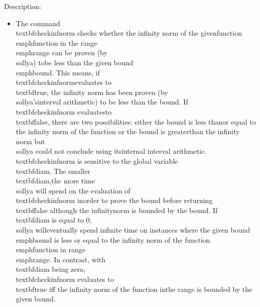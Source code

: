 \noindent Description: \begin{itemize}

\item The command \\textbf{checkinfnorm} checks whether the infinity norm of the given\n   function \\emph{function} in the range \\emph{range} can be proven (by \\sollya) to\n   be less than the given bound \\emph{bound}. This means, if \\textbf{checkinfnorm}\n   evaluates to \\textbf{true}, the infinity norm has been proven (by \\sollya's\n   interval arithmetic) to be less than the bound. If \\textbf{checkinfnorm} evaluates\n   to \\textbf{false}, there are two possibilities: either the bound is less than\n   or equal to the infinity norm of the function or the bound is greater\n   than the infinity norm but \\sollya could not conclude using its\n   internal interval arithmetic.\n    \n   \\textbf{checkinfnorm} is sensitive to the global variable \\textbf{diam}. The smaller \\textbf{diam},\n   the more time \\sollya will spend on the evaluation of \\textbf{checkinfnorm} in\n   order to prove the bound before returning \\textbf{false} although the infinity\n   norm is bounded by the bound. If \\textbf{diam} is equal to $0$, \\sollya will\n   eventually spend infinite time on instances where the given bound\n   \\emph{bound} is less or equal to the infinity norm of the function\n   \\emph{function} in range \\emph{range}. In contrast, with \\textbf{diam} being zero,\n   \\textbf{checkinfnorm} evaluates to \\textbf{true} iff the infinity norm of the function in\n   the range is bounded by the given bound.\n\end{itemize}
